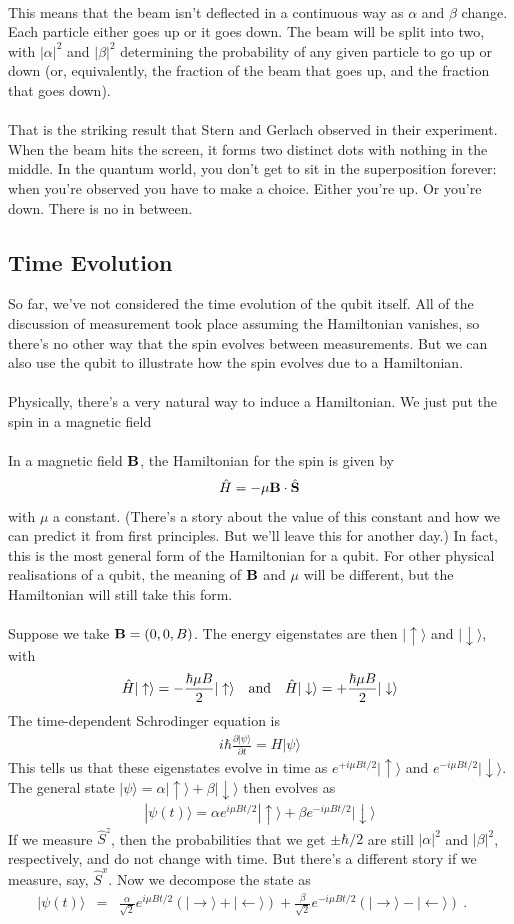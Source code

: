 \documentclass[12pt]{article}
\def\be{\begin{eqnarray}}
\def\ee{\end{eqnarray}}
\newcommand{\nn}{\nonumber}
\newcommand\para{\paragraph{}}
\newcommand{\ppp}[2]{\frac{\partial {#1}}{\partial {#2}}}
\newcommand{\ket}[1]{|#1\rangle}
\newcommand{\co}{\color{olive}}
\newcommand{\upket}{|\uparrow\rangle}
\newcommand{\downket}{|\downarrow\rangle}
\newcommand{\rightket}{|\rightarrow\rangle}
\newcommand{\leftket}{|\leftarrow\rangle}
\begin{document}
{{\para
This means that the beam isn't deflected in a continuous way as $\alpha$ and  $\beta$ change. Each particle either goes up or it goes down. The beam will be split into two, with $|\alpha|^2$ and $|\beta|^2$ determining the probability of any given particle to go up or down (or, equivalently, the fraction of the beam that goes up, and the fraction that goes down).

\para
That is the striking result that Stern and Gerlach observed in their experiment. When the beam hits the screen, it forms two  distinct dots with nothing in the middle. In the quantum world, you don't get to sit in the superposition forever: when you're observed you have to make a choice. Either you're up. Or you're down. There is no in between. 

}





\subsection{Time Evolution}

So far, we've not considered the time evolution of the qubit itself. All of the discussion of measurement took place assuming the Hamiltonian vanishes, so there's no other way that the spin evolves between measurements. But we can also use the qubit to illustrate how the spin evolves due to a Hamiltonian.

\para
Physically, there's a very natural way to induce a Hamiltonian. We just put the spin in a magnetic field 

\para
{\co In a magnetic field ${\bf B}$, the Hamiltonian for the spin is given by 
%
\be \hat{H}= -\mu{\bf B}\cdot \hat{\bf S}\nn\ee
%
with $\mu$ a constant.} (There's a story about the value of this constant and how we can predict it from first principles. But we'll leave this for another day.) In fact, this is the most general form of the Hamiltonian for a qubit. For other physical realisations of a qubit, the meaning of ${\bf B}$ and $\mu$ will be different, but the Hamiltonian will still take this form.




\para
{\co Suppose we take ${\bf B} = (0,0,B)$. The energy eigenstates are then $\upket$ and $\downket$, with
%
\be \hat{H}\upket =-\frac{\hbar \mu B}{2} \upket\ \ \ {\rm and}\ \ \ \hat{H}\downket = +\frac{\hbar\mu B}{2} \downket\nn\ee
%
The time-dependent Schrodinger equation  is 
%
%
\be i\hbar\ppp{\ket{\psi}}{t} = H\ket{\psi} \nn\ee
%
This tells us that these eigenstates evolve in time as $e^{+i\mu B t/2}\upket$ and $e^{-i\mu Bt/2}\downket$. The general state $\ket{\psi}= \alpha \upket + \beta\downket$ then evolves as
%
\be \ket{\psi(t)} = \alpha e^{i\mu B t/2} \upket + \beta e^{-i\mu B t/2}\downket \nn\ee
%
If we measure $\hat{S}^z$, then  the probabilities that we get $\pm \hbar/2$ are still $|\alpha|^2$ and $|\beta|^2$, respectively, and do not change with time. But there's a different story if we measure, say, $\hat{S}^x$. Now we decompose the state as
%
\be \ket{\psi(t)} &=& \frac{\alpha}{\sqrt{2}} e^{i\mu Bt/2} \left(\rightket + \leftket\right) + \frac{\beta}{\sqrt{2}}e^{-i\mu B t/2}\left(\rightket-\leftket\right)\ .\ \ \ \ \ \ee
%


}}
\end{document}
